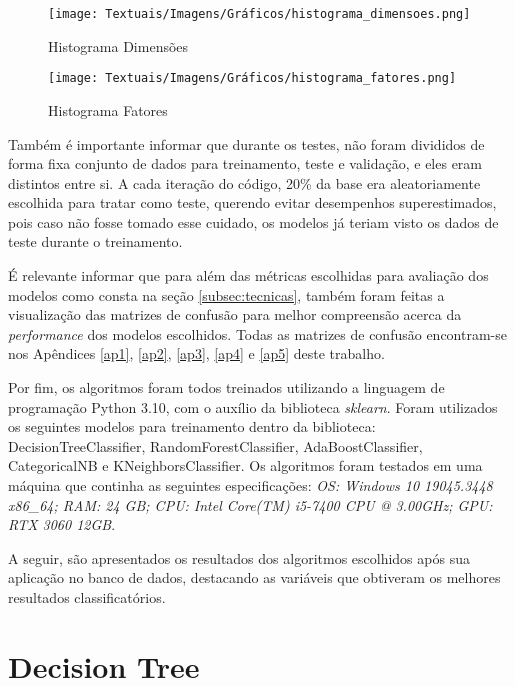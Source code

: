 \begin{figure}[htp!]
    \centering
    \caption{Histograma Dimensões}
    \texttt{[image: Textuais/Imagens/Gráficos/histograma\_dimensoes.png]}
    \label{fig:histograma-dimensoes}
\end{figure}

\begin{figure}[htp!]
    \centering
    \caption{Histograma Fatores}
    \texttt{[image: Textuais/Imagens/Gráficos/histograma\_fatores.png]}
    \label{fig:histograma-fatores}
\end{figure}

Também é importante informar que durante os testes, não foram divididos de forma fixa conjunto de dados para treinamento, teste e validação, e eles eram distintos entre si. A cada iteração do código, 20\% da base era aleatoriamente escolhida para tratar como teste, querendo evitar desempenhos superestimados, pois caso não fosse tomado esse cuidado, os modelos já teriam visto os dados de teste durante o treinamento.

É relevante informar que para além das métricas escolhidas para avaliação dos modelos como consta na seção \ref{subsec:tecnicas}, também foram feitas a visualização das matrizes de confusão para melhor compreensão acerca da \textit{performance} dos modelos escolhidos. Todas as matrizes de confusão encontram-se nos Apêndices \ref{ap1}, \ref{ap2}, \ref{ap3}, \ref{ap4} e \ref{ap5} deste trabalho.

Por fim, os algoritmos foram todos treinados utilizando a linguagem de programação Python 3.10, com o auxílio da biblioteca \textit{sklearn}. Foram utilizados os seguintes modelos para treinamento dentro da biblioteca: DecisionTreeClassifier, RandomForestClassifier, AdaBoostClassifier, CategoricalNB e KNeighborsClassifier. Os algoritmos foram testados em uma máquina que continha as seguintes especificações: \textit{OS: Windows 10 19045.3448 x86\_64;
RAM: 24 GB;
CPU: Intel Core(TM) i5-7400 CPU @ 3.00GHz;
GPU: RTX 3060 12GB}.

A seguir, são apresentados os resultados dos algoritmos escolhidos após sua aplicação no banco de dados, destacando as variáveis que obtiveram os melhores resultados classificatórios.

\section{Decision Tree}

